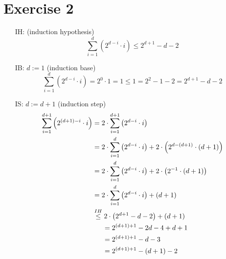 \documentclass{article}
\begin{document}
\section*{Exercise 2}
\begin{itemize}
  \item[IH:] (induction hypothesis)
  \begin{displaymath}
    \sum_{i=1}^{d} \left(2^{d - i} \cdot i\right) \leq 2^{d + 1} - d - 2
  \end{displaymath}
  \item[IB:] $d := 1$ (induction base)
  \begin{displaymath}
    \sum_{i=1}^{d} \left(2^{d - i} \cdot i\right) = 2^0 \cdot 1 = 1
    \leq 1 = 2^2 - 1 - 2 = 2^{d + 1} - d - 2
  \end{displaymath}
  \item[IS:] $d := d + 1$ (induction step)
  \begin{align*}
    \sum_{i=1}^{d + 1} \left(2^{(d + 1) - i} \cdot i\right)
    &= 2 \cdot \sum_{i=1}^{d + 1} \left(2^{d - i} \cdot i\right)\\
    {} &=
      2 \cdot \sum_{i=1}^{d} \left(2^{d - i} \cdot i\right)
      + 2 \cdot \left(2^{d - (d + 1)} \cdot (d + 1)\right)\\
    {} &= 2 \cdot \sum_{i=1}^{d} \left(2^{d - i} \cdot i\right)
      + 2 \cdot \left(2^{-1} \cdot (d + 1)\right)\\
    {} &= 2 \cdot \sum_{i=1}^{d} \left(2^{d - i} \cdot i\right)
      + (d + 1)\\
    {} & \stackrel{IH}{\leq}
      2 \cdot \left(2^{d + 1} - d - 2\right) + (d + 1)\\
    {} & \hspace{1.5em} = 2^{(d + 1) + 1} - 2d - 4 + d + 1\\
    {} & \hspace{1.5em} = 2^{(d + 1) + 1} - d - 3\\
    {} & \hspace{1.5em} = 2^{(d + 1) + 1} - (d + 1) - 2
  \end{align*}
\end{itemize}
\end{document}

